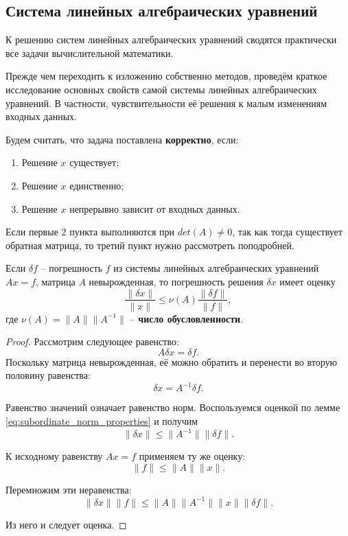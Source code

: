 \documentclass{article}
\begin{document}
\proofexercise

\subsection{Система линейных алгебраических уравнений}
К решению систем линейных алгебраических уравнений сводятся практически все
задачи вычислительной математики.

Прежде чем переходить к изложению собственно методов, проведём краткое
исследование основных свойств самой системы линейных алгебраических уравнений. В
частности, чувствительности её решения к малым изменениям входных данных.

\begin{define}
	Будем считать, что задача поставлена \textbf{корректно}, если:
	\begin{enumerate}[nosep]
		\item Решение $x$ существует;
		\item Решение $x$ единственно;
		\item Решение $x$ непрерывно зависит от входных данных.
	\end{enumerate}
\end{define}

Если первые 2 пункта выполняются при $det(A)\ne 0$, так как тогда существует
обратная матрица, то третий пункт нужно рассмотреть поподробней.

\begin{theorem}
	Если $\delta f$ -- погрешность $f$ из системы линейных алгебраических
	уравнений $Ax=f$, матрица $A$ невырожденная, то погрешность решения
	$\delta x$ имеет оценку
	\[\boxed{\frac{\|\delta x\|}{\|x\|}\le\nu(A)\frac{\|\delta f\|}
	{\|f\|}},\]
	где $\nu(A)=\|A\|\|A^{-1}\|$ -- \textbf{число обусловленности}.
\end{theorem}

\begin{proof}
	Рассмотрим следующее равенство:
	\[A\delta x=\delta f.\]
	Поскольку матрица невырожденная, её можно обратить и перенести во вторую
	половину равенства:
	\[\delta x=A^{-1}\delta f.\]

	Равенство значений означает равенство норм. Воспользуемся оценкой по
	лемме \eqref{eq:subordinate_norm_properties} и получим
	\[\|\delta x\|\le\|A^{-1}\|\|\delta f\|.\]

	К исходному равенству $Ax=f$ применяем ту же оценку:
	\[\|f\|\le\|A\|\|x\|.\]

	Перемножим эти неравенства:
	\[\|\delta x\|\|f\|\le\|A\|\|A^{-1}\|\|x\|\|\delta f\|.\]

	Из него и следует оценка.
\end{proof}
\end{document}
